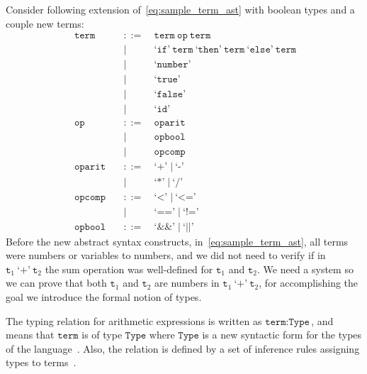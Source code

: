 \documentclass[
  oneside,
  english,
  coorientadorbanca,
  embeddedlogo,
  noabntexcite
]{ufsc-thesis-rn46-2019}
\def\ppp{::=}
\newcommand{\code}[1]{\texttt{#1}}
\newcommand{\bnfvar}[1]{\ \bnfvars{#1}}
\newcommand{\bnfvars}[1]{\code{#1}}
\newcommand{\bnfter}[1]{\ \bnfters{#1}}
\newcommand{\bnfters}[1]{\textrm{`}\code{#1}\textrm{'}}
\newcommand{\bnfor}[1]{\;\mid{} #1}
\newcommand{\bnfprod}[2]{\bnfvars{#1} &\ &\ppp& #2}
\newcommand{\bnfmore}[1]{ && \mid{} & #1}
\begin{document}
Consider following extension of~\eqref{eq:sample_term_ast} with boolean types and a couple new terms:
\begin{equation}~\label{eq:sample_term_ast_bool}
  \begin{alignedat}{2}
    \bnfprod{term}{\bnfvar{term} \bnfvar{op} \bnfvar{term}} \\
    \bnfmore{\bnfter{if} \bnfvar{term} \bnfter{then} \bnfvar{term} \bnfter{else} \bnfvar{term}} \\
    \bnfmore{\bnfter{number}}                              \\
    \bnfmore{\bnfter{true}}                              \\
    \bnfmore{\bnfter{false}}                              \\
    \bnfmore{\bnfter{id}} \\
    \bnfprod{op}{\bnfvar{oparit}} \\
    \bnfmore{\bnfvar{opbool}} \\
    \bnfmore{\bnfvar{opcomp}} \\
    \bnfprod{oparit}{\bnfter{+} \bnfor{\bnfter{-}}} \\
    \bnfmore{\bnfter{*} \bnfor{\bnfter{/}}} \\
    \bnfprod{opcomp}{\bnfter{<} \bnfor{\bnfter{<=}}} \\
    \bnfmore{\bnfter{==} \bnfor{\bnfter{!=}}} \\
    \bnfprod{opbool}{\bnfter{\&\&} \bnfor{\bnfter{||}}}
  \end{alignedat}
\end{equation}
Before the new abstract syntax constructs, in~\eqref{eq:sample_term_ast}, all terms were numbers or variables to numbers, and we did not need to verify if in $\bnfvars{t}_1 \bnfter{+} \bnfvar{t}_2$ the sum operation was well-defined for $\bnfvars{t}_1$ and $\bnfvars{t}_2$.
We need a system so we can prove that both $\bnfvars{t}_1$ and $\bnfvars{t}_2$ are numbers in $\bnfvars{t}_1 \bnfter{+} \bnfvar{t}_2$, for accomplishing the goal we introduce the formal notion of types.

The typing relation for arithmetic expressions is written as $\bnfvars{term} : \bnfvars{Type}$, and means that $\bnfvars{term}$ is of type $\bnfvars{Type}$ where $\bnfvars{Type}$ is a new syntactic form for the types of the language~\cite{pierce2002types}. Also, the relation is defined by a set of inference rules assigning types to terms~\cite{pierce2002types}.
\end{document}
